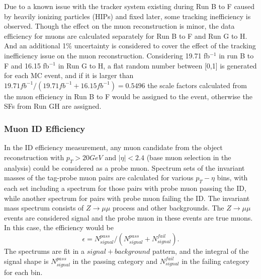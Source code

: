\vspace{0.3cm}
Due to a known issue with the tracker system existing during Run B to F caused by heavily ionizing particles (HIPs) and fixed later, some tracking inefficiency is observed. Though the effect on the muon reconstruction is minor, the data efficiency for muons are calculated separately for Run B to F and Run G to H. And an additional 1\% uncertainty is considered to cover the effect of the tracking inefficiency issue on the muon reconstruction. Considering 19.71 fb$^{-1}$ in run B to F and 16.15 fb$^{-1}$ in Run G to H, a flat random number between [0,1] is generated for each MC event, and if it is larger than $19.71 fb^{-1}/(19.71 fb^{-1}+16.15 fb^{-1})=0.5496$ the scale factors calculated from the muon efficiency in Run B to F would be assigned to the event, otherwise the SFs from Run GH are assigned.

\subsubsection{Muon ID Efficiency}
In the ID efficiency measurement, any muon candidate from the object reconstruction with $p_T > 20GeV$ and $|\eta|<2.4$ (base muon selection in the analysis) could be considered as a probe muon. Spectrum sets of the invariant masses of the tag-probe muon pairs are calculated for various $p_T - \eta$ bins, with each set including a spectrum for those pairs with probe muon passing the ID, while another spectrum for pairs with probe muon failing the ID. The invariant mass spectrum consists of $Z\rightarrow \mu\mu$ process and other backgrounds. The $Z\rightarrow \mu\mu$ events are considered signal and the probe muon in these events are true muons. In this case, the efficiency would be 
\begin{equation}
\epsilon=N_{signal}^{pass}/(N_{signal}^{pass}+N_{signal}^{fail}). 
\end{equation}
The spectrums are fit in a $signal+background$ pattern, and the integral of the signal shape is $N_{signal}^{pass}$ in the passing category and $N_{signal}^{fail}$ in the failing category for each bin. 

